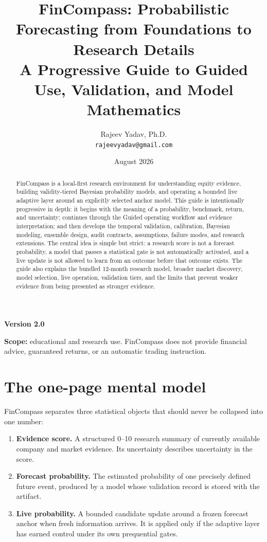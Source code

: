 \documentclass[11pt]{article}
\title{\textbf{FinCompass: Probabilistic Forecasting from Foundations to Research Details}\\[0.35em]\large A Progressive Guide to Guided Use, Validation, and Model Mathematics}
\author{Rajeev Yadav, Ph.D.\\\texttt{rajeevyadav@gmail.com}}
\date{August 2026}
\begin{document}
\maketitle
\begin{center}
\textbf{Version 2.0}
\end{center}

\begin{abstract}
FinCompass is a local-first research environment for understanding equity evidence, building validity-tiered Bayesian probability models, and operating a bounded live adaptive layer around an explicitly selected anchor model. This guide is intentionally progressive in depth: it begins with the meaning of a probability, benchmark, return, and uncertainty; continues through the Guided operating workflow and evidence interpretation; and then develops the temporal validation, calibration, Bayesian modeling, ensemble design, audit contracts, assumptions, failure modes, and research extensions. The central idea is simple but strict: a research score is not a forecast probability, a model that passes a statistical gate is not automatically activated, and a live update is not allowed to learn from an outcome before that outcome exists. The guide also explains the bundled 12-month research model, broader market discovery, model selection, live operation, validation tiers, and the limits that prevent weaker evidence from being presented as stronger evidence.
\end{abstract}

\textbf{Scope:} educational and research use. FinCompass does not provide financial advice, guaranteed returns, or an automatic trading instruction.

\tableofcontents
\newpage

\section{The one-page mental model}

FinCompass separates three statistical objects that should never be collapsed into one number:

\begin{enumerate}
\item \textbf{Evidence score.} A structured 0--10 research summary of currently available company and market evidence. Its uncertainty describes uncertainty in the score.
\item \textbf{Forecast probability.} The estimated probability of one precisely defined future event, produced by a model whose validation record is stored with the artifact.
\item \textbf{Live probability.} A bounded candidate update around a frozen forecast anchor when fresh information arrives. It is applied only if the adaptive layer has earned control under its own prequential gates.
\end{enumerate}
\end{document}
